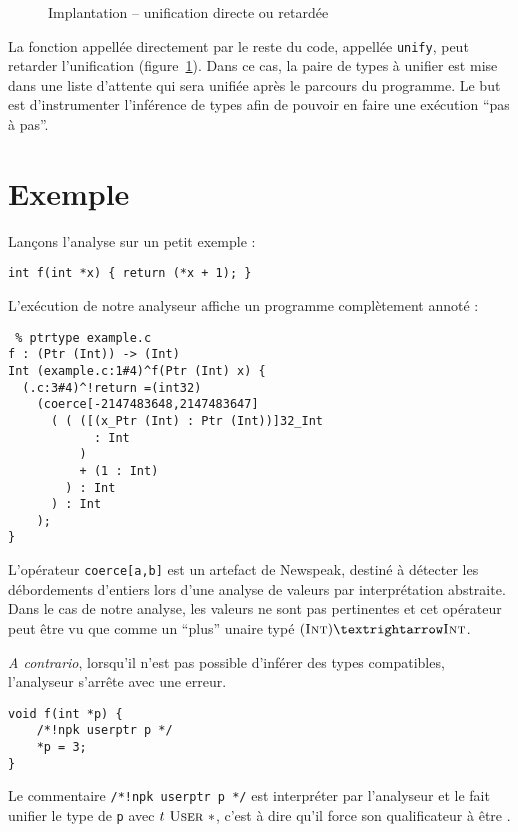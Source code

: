 \begin{figure}


\caption{Implantation -- unification directe ou retardée}
\label{fig:implem-lazy}
\end{figure}

La fonction appellée directement par le reste du code, appellée \texttt{unify},
peut retarder l'unification (figure~\ref{fig:implem-lazy}). Dans ce cas, la
paire de types à unifier est mise dans une liste d'attente qui sera unifiée
après le parcours du programme. Le but est d'instrumenter l'inférence de types
afin de pouvoir en faire une exécution ``pas à pas''.

\section{Exemple}

Lançons l'analyse sur un petit exemple :

\begin{verbatim}
int f(int *x) { return (*x + 1); }
\end{verbatim}

L'exécution de notre analyseur affiche un programme complètement annoté :

\begin{verbatim}
 % ptrtype example.c
f : (Ptr (Int)) -> (Int)
Int (example.c:1#4)^f(Ptr (Int) x) {
  (.c:3#4)^!return =(int32)
    (coerce[-2147483648,2147483647]
      ( ( ([(x_Ptr (Int) : Ptr (Int))]32_Int
            : Int
          )
          + (1 : Int)
        ) : Int
      ) : Int
    );
}
\end{verbatim}

L'opérateur \texttt{coerce[a,b]} est un artefact de Newspeak, destiné à détecter
les débordements d'entiers lors d'une analyse de valeurs par interprétation
abstraite. Dans le cas de notre analyse, les valeurs ne sont pas pertinentes et
cet opérateur peut être vu que comme un ``plus'' unaire typé $(\tInt) → \tInt$.

\emph{A contrario}, lorsqu'il n'est pas possible d'inférer des types
compatibles, l'analyseur s'arrête avec une erreur.

\begin{verbatim}
void f(int *p) {
    /*!npk userptr p */
    *p = 3;
}
\end{verbatim}

Le commentaire \texttt{/*!npk userptr p */} est interpréter par l'analyseur et
le fait unifier le type de \texttt{p} avec $t~\textsc{User}~*$, c'est à dire qu'il
force son qualificateur à être \qUser.

